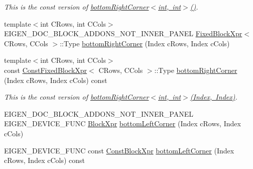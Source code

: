 \begin{DoxyCompactItemize}
\begin{DoxyCompactList}\small\item\em This is the const version of \mbox{\hyperlink{class_eigen_1_1_dense_base_a0ec93fbbf57f19fd6253fe1bef9a960c}{bottom\+Right\+Corner$<$int, int$>$()}}. \end{DoxyCompactList}\item 
{\footnotesize template$<$int C\+Rows, int C\+Cols$>$ }\\E\+I\+G\+E\+N\+\_\+\+D\+O\+C\+\_\+\+B\+L\+O\+C\+K\+\_\+\+A\+D\+D\+O\+N\+S\+\_\+\+N\+O\+T\+\_\+\+I\+N\+N\+E\+R\+\_\+\+P\+A\+N\+EL \mbox{\hyperlink{struct_eigen_1_1_dense_base_1_1_fixed_block_xpr}{Fixed\+Block\+Xpr}}$<$ C\+Rows, C\+Cols $>$\+::Type \mbox{\hyperlink{class_eigen_1_1_dense_base_af60fcba2704ae771c148de156cf2c96b}{bottom\+Right\+Corner}} (Index c\+Rows, Index c\+Cols)
\item 
\mbox{\label{class_eigen_1_1_dense_base_a43d80e43aca655ed92009030f8d34976}} 
{\footnotesize template$<$int C\+Rows, int C\+Cols$>$ }\\const \mbox{\hyperlink{struct_eigen_1_1_dense_base_1_1_const_fixed_block_xpr}{Const\+Fixed\+Block\+Xpr}}$<$ C\+Rows, C\+Cols $>$\+::Type \mbox{\hyperlink{class_eigen_1_1_dense_base_a43d80e43aca655ed92009030f8d34976}{bottom\+Right\+Corner}} (Index c\+Rows, Index c\+Cols) const
\begin{DoxyCompactList}\small\item\em This is the const version of \mbox{\hyperlink{class_eigen_1_1_dense_base_a6cdf27f6b825097f86fc6bcdbeed9e65}{bottom\+Right\+Corner$<$int, int$>$(\+Index, Index)}}. \end{DoxyCompactList}\item 
E\+I\+G\+E\+N\+\_\+\+D\+O\+C\+\_\+\+B\+L\+O\+C\+K\+\_\+\+A\+D\+D\+O\+N\+S\+\_\+\+N\+O\+T\+\_\+\+I\+N\+N\+E\+R\+\_\+\+P\+A\+N\+EL E\+I\+G\+E\+N\+\_\+\+D\+E\+V\+I\+C\+E\+\_\+\+F\+U\+NC \mbox{\hyperlink{class_eigen_1_1_block}{Block\+Xpr}} \mbox{\hyperlink{class_eigen_1_1_dense_base_a3e7f36548fb49d9e9feac8d563af4ccd}{bottom\+Left\+Corner}} (Index c\+Rows, Index c\+Cols)
\item 
\mbox{\label{class_eigen_1_1_dense_base_ac02039681488eb5a6780b7102e01a394}} 
E\+I\+G\+E\+N\+\_\+\+D\+E\+V\+I\+C\+E\+\_\+\+F\+U\+NC const \mbox{\hyperlink{class_eigen_1_1_block}{Const\+Block\+Xpr}} \mbox{\hyperlink{class_eigen_1_1_dense_base_ac02039681488eb5a6780b7102e01a394}{bottom\+Left\+Corner}} (Index c\+Rows, Index c\+Cols) const

\end{DoxyCompactItemize}
